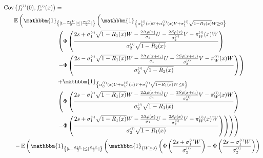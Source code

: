 \documentclass[12pt]{article}
\theoremstyle{Theorem}
\begin{document}
{\small
\begin{align*}
 \text{Cov}\left(f_{t}^{\scriptscriptstyle(1)}(0), f_{s}^{\scriptscriptstyle(i)}(x) \right) & =  \\ 
& \hspace{-2.5cm}\mathbb{E}\left(\mathbbm{1}_{\left\{ |t - \frac{\sigma_2V}{2}| \leq |\frac{\sigma_1U}{2}|\right\}} \left( \mathbbm{1}_{\left\{ \alpha^{\scriptscriptstyle(i)}_{U}(x)U +  \alpha^{\scriptscriptstyle(i)}_{V}(x) V + \sigma^{\scriptscriptstyle(i)}_{1}\sqrt{1-R_1(x)} W \geq 0\right\}} \right. \right. \nonumber \\
& \left. \left. \left(\Phi\left(\frac{2s + \sigma^{\scriptscriptstyle(i)}_{1}\sqrt{1 - R_1(x)}W  - \frac{2\Delta \rho(x) }{\sigma_1} U - \frac{2S\rho(x)}{\sigma^{\scriptscriptstyle(i)}_{2}}V -  \pi^{\scriptscriptstyle(i)}_{W}(x) W}{\sigma^{\scriptscriptstyle(i)}_{2}\sqrt{1 - R_2(x)} } \right)  \right. \right. \right. \nonumber \\
&\left. \left. \left. - \Phi\left(\frac{2s -\sigma^{\scriptscriptstyle(i)}_{1}\sqrt{1 - R_1(x)}W  - \frac{2\Delta \rho(x+e_i) }{\sigma_1} U - \frac{2S\rho(x + e_i)}{\sigma^{\scriptscriptstyle(i)}_{2}}V -  \pi^{\scriptscriptstyle(i)}_{W}(x) W}{\sigma^{\scriptscriptstyle(i)}_{2}\sqrt{1 - R_2(x)} } \right)  \right) \right. \right. \nonumber \\
&   \left. \left. + \mathbbm{1}_{\left\{ \alpha^{\scriptscriptstyle(i)}_{U}(x)U +  \alpha^{\scriptscriptstyle(i)}_{V}(x) V + \sigma^{\scriptscriptstyle(i)}_{1}\sqrt{1 - R_1(x)} W \leq 0\right\}} \right. \right. \nonumber\\
& \left. \left.\left(\Phi\left( \frac{2s -\sigma^{\scriptscriptstyle(i)}_{1}\sqrt{1 - R_1(x)}W  - \frac{2\Delta \rho(x+e_i) }{\sigma_1} U - \frac{2S\rho(x + e_i)}{\sigma^{\scriptscriptstyle(i)}_{2}}V -  \pi^{\scriptscriptstyle(i)}_{W}(x) W}{\sigma^{\scriptscriptstyle(i)}_{2}\sqrt{1 - R_1(x)} }   \right)  \right. \right. \right. \nonumber \\
& \left. \left. \left. - \Phi\left( \frac{2s + \sigma^{\scriptscriptstyle(i)}_{1}\sqrt{1 - R_1(x)}W  - \frac{2\Delta \rho(x) }{\sigma_1} U - \frac{2S\rho(x)}{\sigma^{\scriptscriptstyle(i)}_{2}}V -  \pi^{\scriptscriptstyle(i)}_{W}(x) W}{\sigma^{\scriptscriptstyle(i)}_{2}\sqrt{1 - R_1(x)} }\right)\right)\right)\right) \\
& \hspace{-2.5cm} - \mathbb{E}\left(\mathbbm{1}_{\left\{ |t - \frac{\sigma_2V}{2}| \leq |\frac{\sigma_1U}{2}|\right\}}\left(\mathbbm{1}_{\left\{ W \geq 0\right\}} \left(\Phi\left(\frac{2s + \sigma^{\scriptscriptstyle(i)}_{1}W}{\sigma^{\scriptscriptstyle(i)}_{2}} \right) - \Phi\left(\frac{2s -\sigma^{\scriptscriptstyle(i)}_{1}W }{\sigma^{\scriptscriptstyle(i)}_{2}} \right)\right) \right.\right.\\

\end{align*}}
\end{document}
